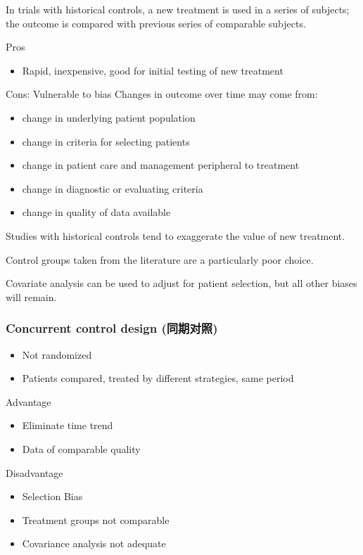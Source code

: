 \documentclass[table,10pt]{beamer}
\begin{document}
\begin{CJK*}{UTF8}{gbsn}
\begin{frame}[t]
In trials with historical controls, a new treatment is used in a series of subjects; the outcome 
is compared with previous series of comparable subjects.
\begin{alertblock}{\center Pros}
\begin{itemize}
	\item Rapid, inexpensive, good for initial testing of new treatment 
\end{itemize}
\end{alertblock}
\begin{alertblock}{\center Cons: Vulnerable to bias}
Changes in outcome over time may come from:
\begin{itemize}
	\item change in underlying patient population
	\item change in criteria for selecting patients
	\item change in patient care and management peripheral to treatment
	\item change in diagnostic or evaluating criteria
	\item change in quality of data available
\end{itemize}
Studies with historical controls tend to exaggerate the value of new treatment.

Control groups taken from the literature are a particularly poor choice.

Covariate analysis can be used to adjust for patient selection, but all other 
biases will remain. 
\end{alertblock}
\end{frame}


\begin{frame}[t]
\frametitle{Concurrent control design (同期对照)}
\begin{itemize}
	\item Not randomized
	\item Patients compared, treated by different strategies, same period
\end{itemize}

\begin{alertblock}{\center Advantage}
\begin{itemize}
	\item Eliminate time trend
	\item Data of comparable quality
\end{itemize}
\end{alertblock}

\begin{alertblock}{Disadvantage}
\begin{itemize}
	\item Selection Bias
	\item Treatment groups not comparable
	\item Covariance analysis not adequate
\end{itemize}
\end{alertblock}
\end{frame}


\end{CJK*}
\end{document}
